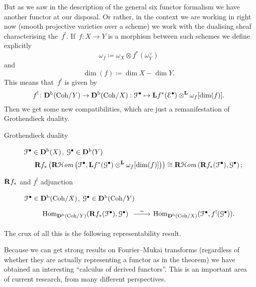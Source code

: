 \documentclass[10pt,a4paper]{article}
\begin{document}
But as we saw in the description of the general six functor formalism we have another functor at our disposal. Or rather, in the context we are working in right now (smooth projective varieties over a scheme) we work with the dualising sheaf characterising the~$f^!$. If~$f\colon X\to Y$ is a morphism between such schemes we define explicitly
\begin{equation}
  \omega_f\coloneqq\omega_X\otimes f^*(\omega_Y^\vee)
\end{equation}
and
\begin{equation}
  \dim(f)\coloneqq\dim X-\dim Y.
\end{equation}
This means that~$f^!$ is given by
\begin{equation}
  f^!\colon\mathbf{D}^{\mathrm{b}}(\mathrm{Coh}/Y)\to\mathbf{D}^{\mathrm{b}}(\mathrm{Coh}/X):\mathcal{F}^\bullet\mapsto\mathbf{L} f^*(\mathcal{E}^\bullet)\otimes^{\mathbf{L}}\omega_f[\dim(f)].
\end{equation}
Then we get some new compatibilities, which are just a remanifestation of Grothendieck duality.
\begin{description}
  \item[Grothendieck duality] $\mathcal{F}^\bullet\in\mathbf{D}^{\mathrm{b}}(X)$, $\mathcal{G}^\bullet\in\mathbf{D}^{\mathrm{b}}(Y)$
    \begin{equation}
      \mathbf{R} f_*\left( \operatorname{\mathbf{R}\mathcal{H}\mathit{om}}\left( \mathcal{F}^\bullet,\mathbf{L} f^*(\mathcal{G}^\bullet)\otimes^{\mathbf{L}}\omega_f[\dim(f)] \right) \right)\cong\operatorname{\mathbf{R}\mathcal{H}\mathit{om}}\left( \mathbf{R} f_*(\mathcal{F}^\bullet),\mathcal{G}^\bullet \right);
    \end{equation}
  \item[$\mathbf{R} f_*$ and $f^!$ adjunction] $\mathcal{F}^\bullet\in\mathbf{D}^{\mathrm{b}}(\mathrm{Coh}/X)$, $\mathcal{G}^\bullet\in\mathbf{D}^{\mathrm{b}}(\mathrm{Coh}/Y)$
    \begin{equation}
      \begin{tikzcd}
        \Hom_{\derived^\bounded(\Coh/Y)}(\RRR f_*(\mathcal{F}^\bullet),\mathcal{G}^\bullet) \arrow{r}{\sim} & \Hom_{\derived^\bounded(\Coh/X)}(\mathcal{F}^\bullet,f^!(\mathcal{G}^\bullet)).
      \end{tikzcd}
    \end{equation}
\end{description}

The crux of all this is the following representability result.
\begin{theorem}
  \fixthis
  \label{theorem:bondal-orlov}
\end{theorem}
Because we can get strong results on Fourier--Mukai transforms (regardless of whether they are actually representing a functor as in the theorem) we have obtained an interesting ``calculus of derived functors''. This is an important area of current research, from many different perspectives.
\end{document}
